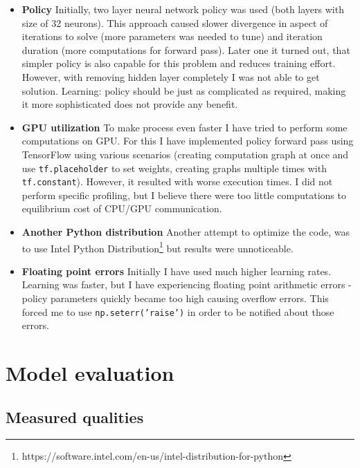 \documentclass[12pt]{article}
\begin{document}
\begin{itemize}
\item{\textbf{Policy}} Initially, two layer neural network policy was used (both layers with size of 32 neurons). This approach caused slower divergence in aspect of iterations to solve (more parameters was needed to tune) and iteration duration (more computations for forward pass). Later one it turned out, that simpler policy is also capable for this problem and reduces training effort. However, with removing hidden layer completely I was not able to get solution. Learning: policy should be just as complicated as required, making it more sophisticated does not provide any benefit.

\item{\textbf{GPU utilization}} To make process even faster I have tried to perform some computations on GPU. For this I have implemented policy forward pass using TensorFlow\cite{tensorflow} using various scenarios (creating computation graph at once and use \texttt{tf.placeholder} to set weights, creating graphs multiple times with \texttt{tf.constant}). However, it resulted with worse execution times. I did not perform specific profiling, but I believe there were too little computations to equilibrium cost of CPU/GPU communication.

\item{\textbf{Another Python distribution}} Another attempt to optimize the code, was to use Intel Python Distribution\footnote{https://software.intel.com/en-us/intel-distribution-for-python} but results were unnoticeable.

\item{\textbf{Floating point errors}} Initially I have used much higher learning rates. Learning was faster, but I have experiencing floating point arithmetic errors - policy parameters quickly became too high causing overflow errors. This forced me to use \texttt{np.seterr('raise')} in order to be notified about those errors.

\end{itemize}



\section{Model evaluation}

\subsection{Measured qualities}
\end{document}
